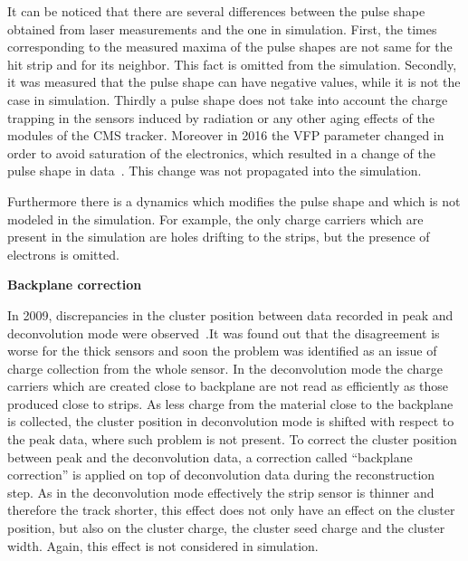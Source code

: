 It can be noticed that there are several differences between the pulse shape obtained from laser measurements and the one in simulation. First, the times corresponding to the measured maxima of the pulse shapes are not same for the hit strip and for its neighbor. This fact is omitted from the simulation. Secondly, it was measured that the pulse shape can have negative values, while it is not the case in simulation. Thirdly a pulse shape does not take into account the charge trapping in the sensors induced by radiation or any other aging effects of the modules of the CMS tracker. Moreover in 2016 the VFP parameter changed in order to avoid saturation of the electronics, which resulted in a change of the pulse shape in data~\cite{website:vfp}. This change was not propagated into the simulation.

Furthermore there is a dynamics which modifies the pulse shape and which is not modeled in the simulation. For example, the only charge carriers which are present in the simulation are holes drifting to the strips, but the presence of electrons is omitted.

\textbf{Backplane correction}

In 2009, discrepancies in the cluster position between data recorded in peak and deconvolution mode were observed~\cite{website:backplane}.It was found out that the disagreement is worse for the thick sensors and soon the problem was identified as an issue of charge collection from the whole sensor. In the deconvolution mode the charge carriers which are created close to backplane are not read as efficiently as those produced close to strips. As less charge from the material close to the backplane is collected, the cluster position in deconvolution mode is shifted with respect to the peak data, where such problem is not present. To correct the cluster position between peak and the deconvolution data, a correction called ``backplane correction'' is applied on top of deconvolution data during the reconstruction step. As in the deconvolution mode effectively the strip sensor is thinner and therefore the track shorter, this effect does not only have an effect on the cluster position, but also on the cluster charge, the cluster seed charge and the cluster width. Again, this effect is not considered in simulation.




